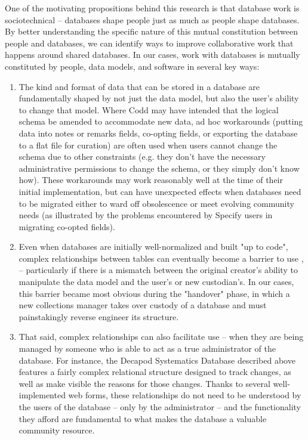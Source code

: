 One of the motivating propositions behind this research is that database work is sociotechnical -- databases shape people just as much as people shape databases. By better understanding the specific nature of this mutual constitution between people and databases, we can identify ways to improve collaborative work that happens around shared databases. In our cases, work with databases is mutually constituted by people, data models, and software in several key ways: 
\begin{enumerate}
\item The kind and format of data that can be stored in a database are fundamentally shaped by not just the data model, but also the user’s ability to change that model. Where Codd may have intended that the logical schema be amended to accommodate new data, ad hoc workarounds (putting data into notes or remarks fields, co-opting fields, or exporting the database to a flat file for curation) are often used when users cannot change the schema due to other constraints (e.g. they don't have the necessary administrative permissions to change the schema, or they simply don't know how). These workarounds may work reasonably well at the time of their initial implementation, but can have unexpected effects when databases need to be migrated either to ward off obsolescence or meet evolving community needs (as illustrated by the problems encountered by Specify users in migrating co-opted fields). 
\item Even when databases are initially well-normalized and built "up to code", complex relationships between tables can eventually become a barrier to use \cite{jagadish2007making}, – particularly if there is a mismatch between the original creator’s ability to manipulate the data model and the user’s or new custodian's. In our cases, this barrier became most obvious during the "handover" phase, in which a new collections manager takes over custody of a database and must painstakingly reverse engineer its structure. 
\item That said, complex relationships can also facilitate use -- when they are being managed by someone who is able to act as a true administrator of the database. For instance, the Decapod Systematics Database described above features a fairly complex relational structure designed to track changes, as well as make visible the reasons for those changes. Thanks to several well-implemented web forms, these relationships do not need to be understood by the users of the database – only by the administrator -- and the functionality they afford are fundamental to what makes the database a valuable community resource.

\end{enumerate}
